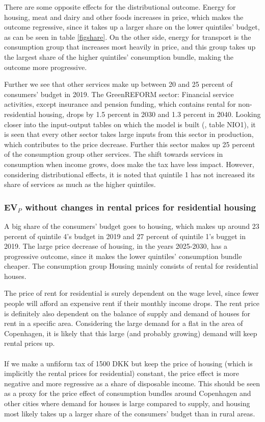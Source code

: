 There are some opposite effects for the distributional outcome. Energy for housing, meat and dairy and other foods increases in price, which makes the outcome regressive, since it takes up a larger share on the lower quintiles' budget, as can be seen in table \ref{figshare}. On the other side, energy for transport is the consumption group that increases most heavily in price, and this group takes up the largest share of the higher quintiles' consumption bundle, making the outcome more progressive.

Further we see that other services make up between 20 and 25 percent of consumers' budget in 2019. The GreenREFORM sector: Financial service activities, except insurance and pension funding, which contains rental for non-residential housing, drops by 1.5 percent in 2030 and 1.3 percent in 2040. Looking closer into the input-output tables on which the model is built (\cite{statbank}, table NIO1), it is seen that every other sector takes large inputs from this sector in production, which contributes to the price decrease. Further this sector makes up 25 percent of the consumption group other services. The shift towards services in consumption when income grows, does make the tax have less impact. However, considering distributional effects, it is noted that quintile 1 has not increased its share of services as much as the higher quintiles.


\subsubsection{EV$_P$ without changes in rental prices for residential housing}
A big share of the consumers' budget goes to housing, which makes up around 23 percent of quintile 4's budget in 2019 and 27 percent of quintile 1's bugget in 2019. The large price decrease of housing, in the years 2025-2030, has a progressive outcome, since it makes the lower quintiles' consumption bundle cheaper. The consumption group Housing mainly consists of rental for residential houses.

The price of rent for residential is surely dependent on the wage level, since fewer people will afford an expensive rent if their monthly income drops. The rent price is definitely also dependent on the balance of supply and demand of houses for rent in a specific area. Considering the large demand for a flat in the area of Copenhagen, it is likely that this large (and probably growing) demand will keep rental prices up.
\\
\\
If we make a unfiform tax of 1500 DKK but keep the price of housing (which is implicitly the rental prices for residential) constant, the price effect is more negative and more regressive as a share of disposable income. This should be seen as a proxy for the price effect of consumption bundles around Copenhagen and other cities where demand for houses is large compared to supply, and housing most likely takes up a larger share of the consumers' budget than in rural areas.

